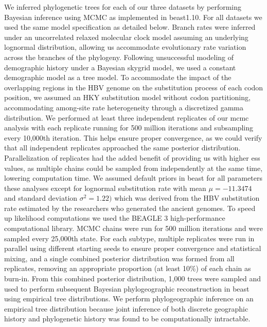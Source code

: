 We inferred phylogenetic trees for each of our three datasets by performing Bayesian inference using MCMC as implemented in \gls{beast}1.10\cite{suchard2018bayesian}.
For all datasets we used the same model specification as detailed below.
Branch rates were inferred under an uncorrelated relaxed molecular clock model assuming an underlying lognormal distribution, allowing us accommodate evolutionary rate variation across the branches of the phylogeny.
Following unsuccessful modeling of demographic history under a Bayesian skygrid model, we used a constant demographic model as a tree model. %
To accommodate the impact of the overlapping regions in the HBV genome on the substitution process of each codon position, we assumed an HKY substitution model\cite{hasegawa1985dating} without codon partitioning, accommodating among-site rate heterogeneity through a discretized gamma distribution\cite{yang1993maximum}.
We performed at least three independent replicates of our \gls{mcmc} analysis with each replicate running for 500 million iterations and subsampling every 10,000th iteration.
This helps ensure proper convergence, as we could verify that all independent replicates approached the same posterior distribution.
Parallelization of replicates had the added benefit of providing us with higher \gls{ess} values, as multiple chains could be sampled from independently at the same time, lowering computation time.
We assumed default priors in \gls{beast} for all parameters these analyses except for lognormal substitution rate with mean $\mu=-11.3474$ and standard deviation $\sigma^{2}=1.22)$ which was derived from the HBV substitution rate estimated by the researchers who generated the ancient genomes\cite{muhlemann2018ancient}.
To speed up likelihood computations we used the BEAGLE 3 high-performance computational library.
MCMC chains were run for 500 million iterations and were sampled every 25,000th state.
For each subtype, multiple replicates were run in parallel using different starting seeds to ensure proper convergence and statistical mixing, and a single combined posterior distribution was formed from all replicates, removing an appropriate proportion (at least 10\%) of each chain as burn-in.
From this combined posterior distribution, 1,000 trees were sampled and used to perform subsequent Bayesian phylogeographic reconstruction in \gls{beast} using empirical tree distributions.
We perform phylogeographic inference on an empirical tree distribution because joint inference of both discrete geographic history and phylogenetic history was found to be computationally intractable.

